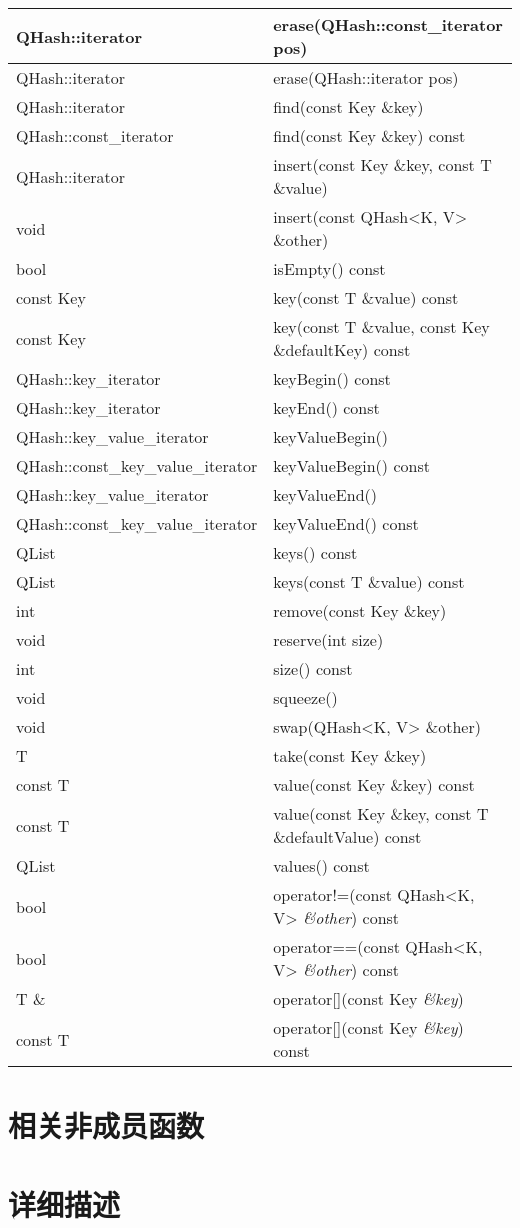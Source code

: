 \begin{longtable}{|l|l|}
\hline
QHash::iterator &	erase(QHash::const\_iterator pos)\\
\hline
QHash::iterator &	erase(QHash::iterator pos)\\
\hline
QHash::iterator &	find(const Key \&key)\\
\hline
QHash::const\_iterator& 	find(const Key \&key) const\\
\hline
QHash::iterator 	&insert(const Key \&key, const T \&value)\\
\hline
void& 	insert(const QHash<K, V> \&other)\\
\hline
bool &	isEmpty() const\\
\hline
const Key& 	key(const T \&value) const\\
\hline
const Key &	key(const T \&value, const Key \&defaultKey) const\\
\hline
QHash::key\_iterator &	keyBegin() const\\
\hline
QHash::key\_iterator &	keyEnd() const\\
\hline
QHash::key\_value\_iterator 	&keyValueBegin()\\
\hline
QHash::const\_key\_value\_iterator& 	keyValueBegin() const\\
\hline
QHash::key\_value\_iterator 	&keyValueEnd()\\
\hline
QHash::const\_key\_value\_iterator &	keyValueEnd() const\\
\hline
QList& 	keys() const\\
\hline
QList& 	keys(const T \&value) const\\
\hline
int &	remove(const Key \&key)\\
\hline
void &	reserve(int size)\\
\hline
int &	size() const\\
\hline
void &	squeeze()\\
\hline
void &	swap(QHash<K, V> \&other)\\
\hline
T 	&take(const Key \&key)\\
\hline
const T &	value(const Key \&key) const\\
\hline
const T &	value(const Key \&key, const T \&defaultValue) const\\
\hline
QList 	&values() const\\
\hline
bool 	&operator!=(const QHash<K, V> \emph{\&other}) const\\
\hline
bool 	&operator==(const QHash<K, V> \emph{\&other}) const\\
\hline
T \& 	&operator[](const Key \emph{\&key})\\
\hline
const T& 	operator[](const Key \emph{\&key}) const\\
\hline
\end{longtable}

\section{相关非成员函数}

\section{详细描述}\label{detail}

